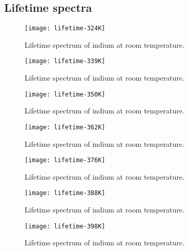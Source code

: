 \documentclass[11pt, english, fleqn, DIV=15, headinclude, BCOR=2cm]{scrreprt}
\begin{document}
\begin{appendix}

        \chapter{Lifetime spectra}

        \begin{figure}
                \centering
                \texttt{[image: lifetime-324K]}
                \caption{%
                        Lifetime spectrum of indium at room temperature.
                }
                \label{fig:lifetime-324K}
        \end{figure}

        \begin{figure}
                \centering
                \texttt{[image: lifetime-339K]}
                \caption{%
                        Lifetime spectrum of indium at room temperature.
                }
                \label{fig:lifetime-339K}
        \end{figure}

        \begin{figure}
                \centering
                \texttt{[image: lifetime-350K]}
                \caption{%
                        Lifetime spectrum of indium at room temperature.
                }
                \label{fig:lifetime-350K}
        \end{figure}

        \begin{figure}
                \centering
                \texttt{[image: lifetime-362K]}
                \caption{%
                        Lifetime spectrum of indium at room temperature.
                }
                \label{fig:lifetime-362K}
        \end{figure}

        \begin{figure}
                \centering
                \texttt{[image: lifetime-376K]}
                \caption{%
                        Lifetime spectrum of indium at room temperature.
                }
                \label{fig:lifetime-376K}
        \end{figure}

        \begin{figure}
                \centering
                \texttt{[image: lifetime-388K]}
                \caption{%
                        Lifetime spectrum of indium at room temperature.
                }
                \label{fig:lifetime-388K}
        \end{figure}

        \begin{figure}
        \centering
        \texttt{[image: lifetime-398K]}
        \caption{%
                Lifetime spectrum of indium at room temperature.
        }
        \label{fig:lifetime-398K}
\end{figure}

\end{appendix}
\end{document}
